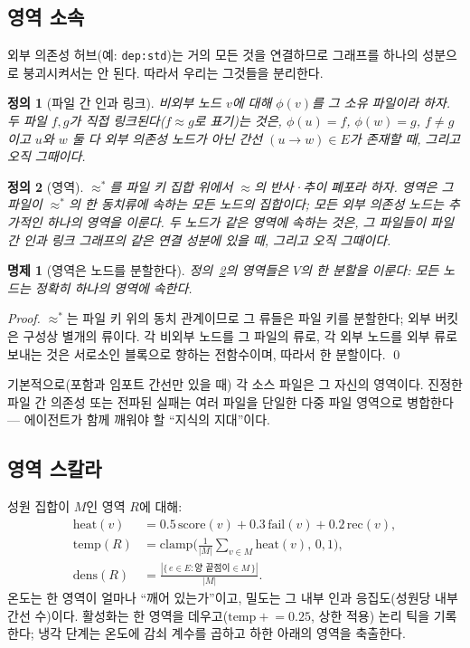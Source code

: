 \documentclass[11pt]{article}
\newtheorem{definition}{정의}
\newtheorem{proposition}{명제}
\newcommand{\code}[1]{\texttt{#1}}
\begin{document}
\subsection{영역 소속}

외부 의존성 허브(예: \code{dep:std})는 거의 모든 것을 연결하므로 그래프를 하나의 성분으로 붕괴시켜서는 안 된다.
따라서 우리는 그것들을 분리한다.

\begin{definition}[파일 간 인과 링크]
비외부 노드 $v$에 대해 $\phi(v)$를 그 소유 파일이라 하자. 두 파일 $f,g$가 \emph{직접 링크}된다($f \approx g$로
표기)는 것은, $\phi(u)=f$, $\phi(w)=g$, $f\neq g$이고 $u$와 $w$ 둘 다 외부 의존성 노드가 아닌 간선
$(u\!\to\!w)\in E$가 존재할 때, 그리고 오직 그때이다.
\end{definition}

\begin{definition}[영역]\label{def:region}
$\approx^{*}$를 파일 키 집합 위에서 $\approx$의 반사·추이 폐포라 하자. \emph{영역}은 그 파일이 $\approx^{*}$의
한 동치류에 속하는 모든 노드의 집합이다; 모든 외부 의존성 노드는 추가적인 하나의 영역을 이룬다. 두 노드가 같은
영역에 속하는 것은, 그 파일들이 파일 간 인과 링크 그래프의 같은 연결 성분에 있을 때, 그리고 오직 그때이다.
\end{definition}

\begin{proposition}[영역은 노드를 분할한다]
정의~\ref{def:region}의 영역들은 $V$의 한 분할을 이룬다: 모든 노드는 정확히 하나의 영역에 속한다.
\end{proposition}
\begin{proof}
$\approx^{*}$는 파일 키 위의 동치 관계이므로 그 류들은 파일 키를 분할한다; 외부 버킷은 구성상 별개의 류이다.
각 비외부 노드를 그 파일의 류로, 각 외부 노드를 외부 류로 보내는 것은 서로소인 블록으로 향하는 전함수이며,
따라서 한 분할이다. \qed
\end{proof}

기본적으로(포함과 임포트 간선만 있을 때) 각 소스 파일은 그 자신의 영역이다. 진정한 파일 간 의존성 또는 전파된
실패는 여러 파일을 단일한 다중 파일 영역으로 병합한다 --- 에이전트가 함께 깨워야 할 ``지식의 지대''이다.

\subsection{영역 스칼라}

성원 집합이 $M$인 영역 $R$에 대해:
\begin{align}
\mathrm{heat}(v)        &= 0.5\,\mathrm{score}(v) + 0.3\,\mathrm{fail}(v) + 0.2\,\mathrm{rec}(v), \\
\mathrm{temp}(R)        &= \mathrm{clamp}\!\Big(\tfrac{1}{|M|}\textstyle\sum_{v\in M}\mathrm{heat}(v),\,0,1\Big), \label{eq:temp}\\
\mathrm{dens}(R)        &= \frac{|\{\,e\in E : \text{양 끝점이} \in M\,\}|}{|M|}. \label{eq:dens}
\end{align}
온도는 한 영역이 얼마나 ``깨어 있는가''이고, 밀도는 그 내부 인과 응집도(성원당 내부 간선 수)이다. 활성화는 한
영역을 데우고($\mathrm{temp}\mathrel{+}=0.25$, 상한 적용) 논리 틱을 기록한다; 냉각 단계는 온도에 감쇠 계수를
곱하고 하한 아래의 영역을 축출한다.
\end{document}

